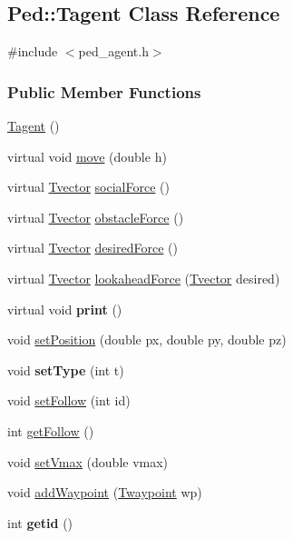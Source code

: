 \hypertarget{classPed_1_1Tagent}{
\subsection{Ped::Tagent Class Reference}
\label{classPed_1_1Tagent}
}


{\ttfamily \#include $<$ped\_\-agent.h$>$}

\subsubsection*{Public Member Functions}
\begin{DoxyCompactItemize}
\item 
\hyperlink{classPed_1_1Tagent_af67112023fe6604e00e74cea6f23c7da}{Tagent} ()
\item 
virtual void \hyperlink{classPed_1_1Tagent_ae3495a0300a6b21e4b8a617882cb3c7e}{move} (double h)
\item 
virtual \hyperlink{classPed_1_1Tvector}{Tvector} \hyperlink{classPed_1_1Tagent_a8ec4fc76d839a87feb57ba597cf97faf}{socialForce} ()
\item 
virtual \hyperlink{classPed_1_1Tvector}{Tvector} \hyperlink{classPed_1_1Tagent_a2129de8742a63a20fcb314c0f09bc917}{obstacleForce} ()
\item 
virtual \hyperlink{classPed_1_1Tvector}{Tvector} \hyperlink{classPed_1_1Tagent_a09533080ce60ae254522d17987b02446}{desiredForce} ()
\item 
virtual \hyperlink{classPed_1_1Tvector}{Tvector} \hyperlink{classPed_1_1Tagent_a4fac86772e3ca3a449d1e6d694d4b0e2}{lookaheadForce} (\hyperlink{classPed_1_1Tvector}{Tvector} desired)
\item 
\hypertarget{classPed_1_1Tagent_a9716c669e45b6b8f43e19de1e60d3df5}{
virtual void {\bfseries print} ()}
\label{classPed_1_1Tagent_a9716c669e45b6b8f43e19de1e60d3df5}

\item 
void \hyperlink{classPed_1_1Tagent_a9f4c084da2e45ffcbc21c1c5194518a5}{setPosition} (double px, double py, double pz)
\item 
\hypertarget{classPed_1_1Tagent_a9ff42868d68948eabb749b84e88446d5}{
void {\bfseries setType} (int t)}
\label{classPed_1_1Tagent_a9ff42868d68948eabb749b84e88446d5}

\item 
void \hyperlink{classPed_1_1Tagent_a94bc6a6fe9684ecb2c880e5db9ff1b31}{setFollow} (int id)
\item 
int \hyperlink{classPed_1_1Tagent_ab0035141923f5f1bede3e163705a559c}{getFollow} ()
\item 
void \hyperlink{classPed_1_1Tagent_aa1c9635b94ba54c0cb00cc34877a75e0}{setVmax} (double vmax)
\item 
void \hyperlink{classPed_1_1Tagent_a63210c597e9db74bdf095dd17502d575}{addWaypoint} (\hyperlink{classPed_1_1Twaypoint}{Twaypoint} wp)
\item 
\hypertarget{classPed_1_1Tagent_a1caa11accf4b7601e22521120e3f8a15}{
int {\bfseries getid} ()}
\label{classPed_1_1Tagent_a1caa11accf4b7601e22521120e3f8a15}


\end{DoxyCompactItemize}
